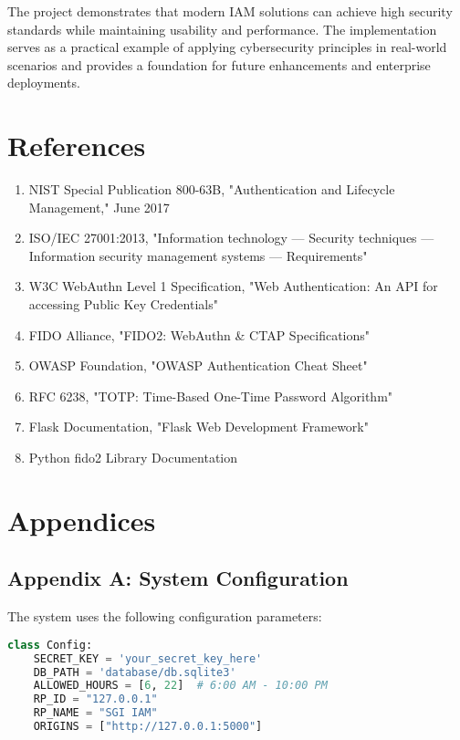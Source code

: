 \documentclass[12pt,a4paper]{article}
\begin{document}
The project demonstrates that modern IAM solutions can achieve high security standards while maintaining usability and performance. The implementation serves as a practical example of applying cybersecurity principles in real-world scenarios and provides a foundation for future enhancements and enterprise deployments.

\section{References}

\begin{enumerate}
    \item NIST Special Publication 800-63B, "Authentication and Lifecycle Management," June 2017
    \item ISO/IEC 27001:2013, "Information technology — Security techniques — Information security management systems — Requirements"
    \item W3C WebAuthn Level 1 Specification, "Web Authentication: An API for accessing Public Key Credentials"
    \item FIDO Alliance, "FIDO2: WebAuthn \& CTAP Specifications"
    \item OWASP Foundation, "OWASP Authentication Cheat Sheet"
    \item RFC 6238, "TOTP: Time-Based One-Time Password Algorithm"
    \item Flask Documentation, "Flask Web Development Framework"
    \item Python fido2 Library Documentation
\end{enumerate}

\section{Appendices}

\subsection{Appendix A: System Configuration}
The system uses the following configuration parameters:

\begin{lstlisting}[language=Python, caption=Configuration Example]
class Config:
    SECRET_KEY = 'your_secret_key_here'
    DB_PATH = 'database/db.sqlite3'
    ALLOWED_HOURS = [6, 22]  # 6:00 AM - 10:00 PM
    RP_ID = "127.0.0.1"
    RP_NAME = "SGI IAM"
    ORIGINS = ["http://127.0.0.1:5000"]
\end{lstlisting}
\end{document}
